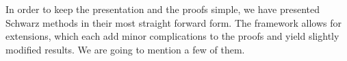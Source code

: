 \begin{intro}
  In order to keep the presentation and the proofs simple, we have
  presented Schwarz methods in their most straight forward form. The
  framework allows for extensions, which each add minor
  complications to the proofs and yield slightly modified results. We
  are going to mention a few of them.
\end{intro}

